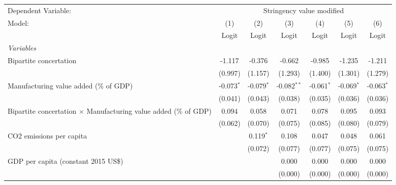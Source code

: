 
\begingroup
\centering
\begin{tabular}{lcccccc}
   \toprule
   Dependent Variable: & \multicolumn{6}{c}{Stringency value modified}\\
   Model:                                                                  & (1)          & (2)          & (3)           & (4)           & (5)           & (6)\\  
                                                                           &  Logit       & Logit        & Logit         & Logit         & Logit         & Logit\\  
   \midrule
   \emph{Variables}\\
   Bipartite concertation                                                  & -1.117       & -0.376       & -0.662        & -0.985        & -1.235        & -1.211\\   
                                                                           & (0.997)      & (1.157)      & (1.293)       & (1.400)       & (1.301)       & (1.279)\\   
   Manufacturing value added (\% of GDP)                                   & -0.073$^{*}$ & -0.079$^{*}$ & -0.082$^{**}$ & -0.061$^{*}$  & -0.069$^{*}$  & -0.063$^{*}$\\   
                                                                           & (0.041)      & (0.043)      & (0.038)       & (0.035)       & (0.036)       & (0.036)\\   
   Bipartite concertation $\times$ Manufacturing value added (\% of GDP)   & 0.094        & 0.058        & 0.071         & 0.078         & 0.095         & 0.093\\   
                                                                           & (0.062)      & (0.070)      & (0.075)       & (0.085)       & (0.080)       & (0.079)\\   
   CO2 emissions per capita                                                &              & 0.119$^{*}$  & 0.108         & 0.047         & 0.048         & 0.061\\   
                                                                           &              & (0.072)      & (0.077)       & (0.077)       & (0.075)       & (0.075)\\   
   GDP per capita (constant 2015 US\$)                                     &              &              & 0.000         & 0.000         & 0.000         & 0.000\\   
                                                                           &              &              & (0.000)       & (0.000)       & (0.000)       & (0.000)\\   

\end{tabular}
